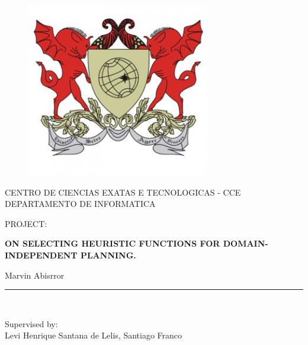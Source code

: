 \documentclass[11pt,a4paper,oneside]{report}
\begin{document}
\begin{titlepage}

\begin{center}
\vspace*{-1in}
\begin{figure}[htb]
\begin{center}
\includegraphics[width=8cm]{./image/ufv1}
\end{center}
\end{figure}

CENTRO DE CIENCIAS EXATAS E TECNOLOGICAS - CCE\\
\vspace*{0.15in}
DEPARTAMENTO DE INFORMATICA \\
\vspace*{0.6in}
\begin{large}
PROJECT:\\
\end{large}
\vspace*{0.2in}
\begin{Large}
\textbf{ON SELECTING HEURISTIC FUNCTIONS FOR DOMAIN-INDEPENDENT PLANNING.} \\
\end{Large}
\vspace*{0.3in}
\begin{large}
Marvin Abisrror\\
\end{large}
\vspace*{0.3in}
\rule{80mm}{0.1mm}\\
\vspace*{0.1in}
\begin{large}
Supervised by: \\
Levi Henrique Santana de Lelis, Santiago Franco \\
\end{large}
\end{center}

\end{titlepage}
\end{document}
